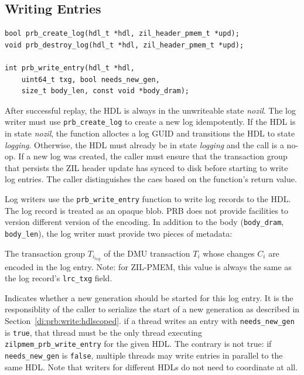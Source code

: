 \documentclass[12pt,a4paper,twoside]{book}
\begin{document}

\subsection{Writing Entries}\label{di:prb:api:write}

\begin{lstlisting}
bool prb_create_log(hdl_t *hdl, zil_header_pmem_t *upd);
void prb_destroy_log(hdl_t *hdl, zil_header_pmem_t *upd);

int prb_write_entry(hdl_t *hdl,
    uint64_t txg, bool needs_new_gen,
    size_t body_len, const void *body_dram);
\end{lstlisting}

After successful replay, the HDL is always in the unwriteable state \textit{nozil}.
The log writer must use \lstinline{prb_create_log} to create a new log idempotently.
If the HDL is in state \textit{nozil}, the function alloctes a log GUID and transitions the HDL to state \textit{logging}.
Otherwise, the HDL must already be in state \textit{logging} and the call is a no-op.
If a new log was created, the caller must ensure that the transaction group that persists the ZIL header update has synced to disk before starting to write log entries.
The caller distinguishes the caes based on the function's return value.

Log writers use the \lstinline{prb_write_entry} function to write log records to the HDL.
The log record is treated as an opaque blob.
PRB does not provide facilities to version different version of the encoding.
In addition to the body (\lstinline{body_dram}, \lstinline{body_len}), the log writer must provide two pieces of metadata:
\begin{description}[noitemsep,leftmargin=1.5cm,labelindent=1cm]
    \item[txg] The transaction group $T_{i_{txg}}$ of the DMU transaction $T_i$ whose changes $C_i$ are encoded in the log entry.
        Note: for ZIL-PMEM, this value is always the same as the log record's \lstinline{lrc_txg} field.
    \item[needs\_new\_gen] Indicates whether a new generation should be started for this log entry.
        It is the responsiblity of the caller to serialize the start of a new generation as described in Section~\ref{di:prb:write:hdlscoped}.
        if a thread writes an entry with \lstinline{needs_new_gen} is \lstinline{true}, that thread must be the only thread executing \lstinline{zilpmem_prb_write_entry} for the given HDL.
        The contrary is not true: if \lstinline{needs_new_gen} is \lstinline{false}, multiple threads may write entries in parallel to the same HDL.
        Note that writers for different HDLs do not need to coordinate at all.
\end{description}
\end{document}
